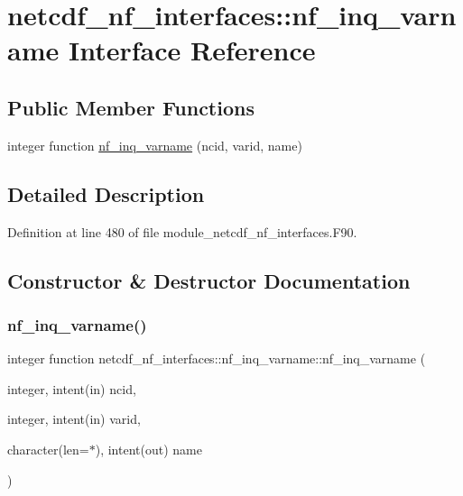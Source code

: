 \hypertarget{interfacenetcdf__nf__interfaces_1_1nf__inq__varname}{}\section{netcdf\+\_\+nf\+\_\+interfaces\+:\+:nf\+\_\+inq\+\_\+varname Interface Reference}
\label{interfacenetcdf__nf__interfaces_1_1nf__inq__varname}
\subsection*{Public Member Functions}
\begin{DoxyCompactItemize}
\item 
integer function \hyperlink{interfacenetcdf__nf__interfaces_1_1nf__inq__varname_a522de681586947c592ce7e3d5110bdef}{nf\+\_\+inq\+\_\+varname} (ncid, varid, name)
\end{DoxyCompactItemize}


\subsection{Detailed Description}


Definition at line 480 of file module\+\_\+netcdf\+\_\+nf\+\_\+interfaces.\+F90.



\subsection{Constructor \& Destructor Documentation}
\mbox{\label{interfacenetcdf__nf__interfaces_1_1nf__inq__varname_a522de681586947c592ce7e3d5110bdef}} 
\subsubsection{\texorpdfstring{nf\+\_\+inq\+\_\+varname()}{nf\_inq\_varname()}}
{\footnotesize\ttfamily integer function netcdf\+\_\+nf\+\_\+interfaces\+::nf\+\_\+inq\+\_\+varname\+::nf\+\_\+inq\+\_\+varname (\begin{DoxyParamCaption}\item[{integer, intent(in)}]{ncid,  }\item[{integer, intent(in)}]{varid,  }\item[{character(len=$\ast$), intent(out)}]{name }\end{DoxyParamCaption})}



